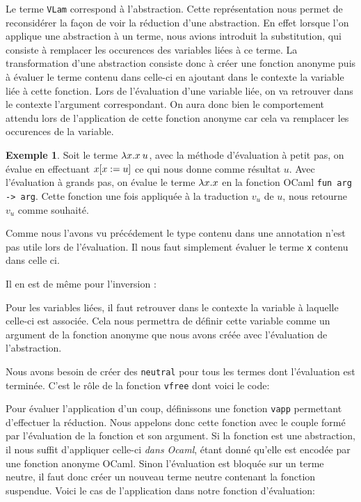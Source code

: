 \documentclass {article}
\newcommand{\codefrom}[3]
           {}
\theoremstyle{definition}
\newtheorem{example}{Exemple}
\theoremstyle{remark}
\newcommand{\fun}[1]{\lstinline!#1!}
\begin{document}
Le terme \fun{VLam} correspond à l'abstraction.
Cette représentation nous permet de reconsidérer la façon de voir la 
réduction d'une abstraction. En effet lorsque l'on applique une abstraction
à un terme, nous avions introduit la substitution, qui consiste à remplacer les occurences 
des variables liées à ce terme. La transformation d'une abstraction consiste donc à 
créer une fonction anonyme puis à évaluer le terme contenu dans celle-ci en ajoutant dans le 
contexte la variable liée à cette fonction. Lors de l'évaluation d'une variable liée, on va
retrouver dans le contexte l'argument correspondant. On aura donc bien le comportement attendu
lors de l'application de cette fonction anonyme car cela va remplacer les occurences de la 
variable.

\begin{example}
  Soit le terme \(\lambda x. x\:u\), avec la méthode
  d'évaluation à petit pas, on évalue en effectuant $x[x := u]$
  ce qui nous donne comme résultat $u$.  Avec l'évaluation à
  grands pas, on évalue le terme $\lambda x. x$ en la fonction OCaml
  \lstinline!fun arg -> arg!. Cette fonction une fois appliquée à la traduction $v_u$ de
  $u$,  nous retourne $v_u$ comme souhaité.
\end{example}


Comme nous l'avons vu précédement le type contenu dans une annotation n'est pas utile lors de l'évaluation.
Il nous faut simplement évaluer le terme \fun{x} contenu dans celle ci.
%
\codefrom{typed}{lambda}{big_step_eval_exTm_ann}

Il en est de même pour l'inversion :
\codefrom{typed}{lambda}{big_step_eval_inTm_inv}


Pour les variables liées, il faut retrouver dans le contexte la variable à laquelle celle-ci est associée.
Cela nous permettra de définir cette variable comme un argument de la fonction anonyme que nous avons
créée avec l'évaluation de l'abstraction.

\codefrom{typed}{lambda}{big_step_eval_exTm_var}

Nous avons besoin de créer des \fun{neutral} pour
tous les termes dont l'évaluation est terminée. C'est le rôle de la fonction
\fun{vfree} dont voici le code:
\codefrom{typed}{lambda}{vfree}


Pour évaluer l'application d'un coup, définissons une fonction 
\fun{vapp} permettant d'effectuer la réduction.  Nous appelons donc cette fonction avec le couple formé
par l'évaluation de la fonction et son argument.  Si la fonction est une abstraction, il nous suffit d'appliquer celle-ci
\emph{dans Ocaml}, étant donné qu'elle est encodée par une fonction
anonyme OCaml. Sinon l'évaluation est bloquée sur un terme neutre, il faut donc
créer un nouveau terme neutre contenant la fonction suspendue.
Voici le cas de l'application dans notre fonction d'évaluation:
\end{document}
